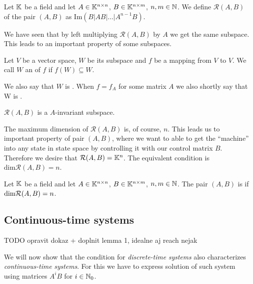 \begin{definition}
	Let $\mathbb{K}$ be a field and let $A \in \mathbb{K}^{n \times n}$, $B \in \mathbb{K}^{n \times m}$, $n,m \in \mathbb{N}$. We define  $\mathcal{R}(A,B)$ of the pair $(A,B)$ as $\text{Im}(B|AB|\ldots|A^{n-1}B)$.
\end{definition}

We have seen that by left multiplying $\mathcal{R}(A,B)$ by $A$ we get the same subspace. This leads to an important property of some subspaces.

\begin{definition}
	Let $V$ be a vector space, $W$ be its subspace and $f$ be a mapping from $V$ to $V$. We call $W$ an  of $f$ if $f(W)\subseteq W$.

	We also say that $W$ is . When $f=f_A$ for some matrix $A$ we also shortly say that W is .
\end{definition}

\begin{remark}
	\label{rem:reachinv}
	$\mathcal{R}(A,B)$ is a $A$-invariant subspace.
\end{remark} 

The maximum dimension of $\mathcal{R}(A,B)$ is, of course, $n$. This leads us to important property of pair $(A,B)$, where we want to able to get the ``machine'' into any state in state space by controlling it with our control matrix $B$. Therefore we desire that $\mathcal{R}(A,B)=\mathbb{K}^n$. The equivalent condition is $\text{dim}\mathcal{R}(A,B)=n$.

\begin{definition}
	Let $\mathbb{K}$ be a field and let $A \in \mathbb{K}^{n \times n}$, $B \in \mathbb{K}^{n \times m}$, $n,m \in \mathbb{N}$. The pair $(A,B)$ is  if $\textnormal{dim}\mathcal{R}(A,B)=n$.
\end{definition}

\subsection{Continuous-time systems}

TODO opravit dokaz + doplnit lemma 1, idealne aj reach nejak

We will now show that the condition for \textit{discrete-time systems} also characterizes \textit{continuous-time systems}. For this we have to express solution of such system using matrices $A^iB$ for $i\in \mathbb{N}_0$. 


